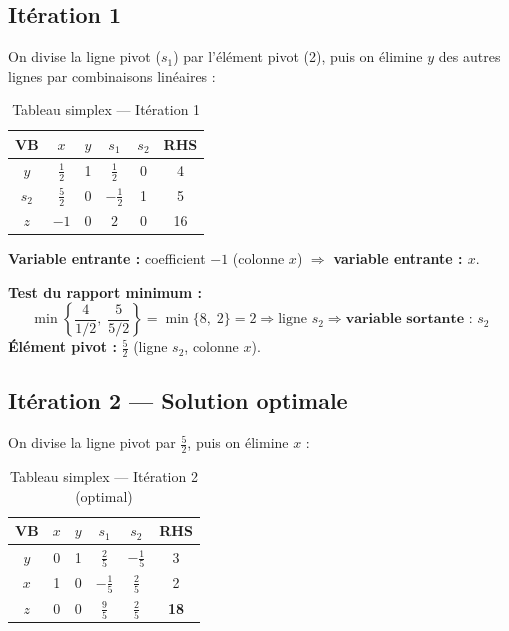 \documentclass[12pt,a4paper]{article}
\begin{document}
\subsection{Itération 1}

On divise la ligne pivot ($s_1$) par l'élément pivot (2), puis on 
élimine $y$ des autres lignes par combinaisons linéaires :

\begin{table}[H]
\centering
\caption{Tableau simplex — Itération 1}
\begin{tabular}{c|cccc|c}
\toprule
\textbf{VB} & $x$ & $y$ & $s_1$ & $s_2$ & \textbf{RHS} \\
\midrule
$y$   & $\frac{1}{2}$ & 1 & $\frac{1}{2}$ & 0 & 4 \\
$s_2$ & \textbf{$\frac{5}{2}$} & 0 & $-\frac{1}{2}$ & 1 & 5 \\
\midrule
$z$   & $-1$ & 0 & $2$ & 0 & 16 \\
\bottomrule
\end{tabular}
\end{table}

\textbf{Variable entrante :} coefficient $-1$ (colonne $x$) $\Rightarrow$ 
\textbf{variable entrante : $x$}.

\textbf{Test du rapport minimum :}
\[
  \min\left\{\frac{4}{1/2},\; \frac{5}{5/2}\right\} = \min\{8,\; 2\} = 2
  \Rightarrow \text{ligne } s_2 \Rightarrow \textbf{variable sortante : } s_2
\]
\textbf{Élément pivot : } $\frac{5}{2}$ (ligne $s_2$, colonne $x$).

\subsection{Itération 2 — Solution optimale}

On divise la ligne pivot par $\frac{5}{2}$, puis on élimine $x$ :

\begin{table}[H]
\centering
\caption{Tableau simplex — Itération 2 (optimal)}
\begin{tabular}{c|cccc|c}
\toprule
\textbf{VB} & $x$ & $y$ & $s_1$ & $s_2$ & \textbf{RHS} \\
\midrule
$y$ & 0 & 1 & $\frac{2}{5}$ & $-\frac{1}{5}$ & 3 \\
$x$ & 1 & 0 & $-\frac{1}{5}$ & $\frac{2}{5}$ & 2 \\
\midrule
$z$ & 0 & 0 & $\frac{9}{5}$ & $\frac{2}{5}$ & \textbf{18} \\
\bottomrule
\end{tabular}
\end{table}
\end{document}
